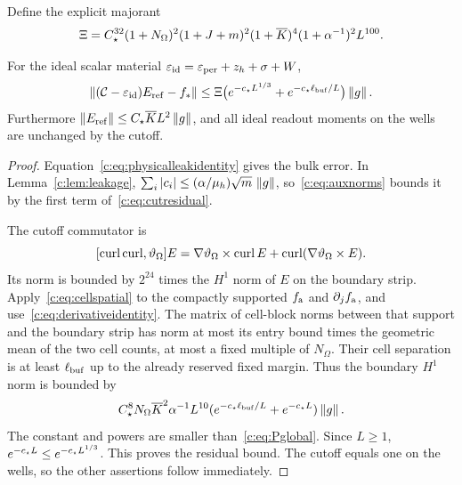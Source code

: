 Define the explicit majorant
\begin{equation}
 \Xi=C_\star^{32}(1+N_\Omega)^2(1+J+m)^2
                  (1+\overline K)^4(1+\alpha^{-1})^2L^{100}.   \label{c:eq:Pglobal}
\end{equation}
\begin{lemma}
\label{c:lem:cutresidual}
For the ideal scalar material
$\varepsilon_{\rm id}=\varepsilon_{\rm per}+z_h+\sigma+W$,
\begin{equation}
 \left\lVert (\mathcal C-\varepsilon_{\rm id})E_{\rm ref}-f_*\right\rVert
 \le\Xi\big(e^{-c_\star L^{1/3}}+e^{-c_\star \ell_{\rm buf}/L}\big)\left\lVert g\right\rVert.
                                                               \label{c:eq:cutresidual}
\end{equation}
Furthermore $\left\lVert E_{\rm ref}\right\rVert\le C_\star \overline KL^2\left\lVert g\right\rVert$, and all ideal readout
moments on the wells are unchanged by the cutoff.
\end{lemma}
\begin{proof}
Equation~\eqref{c:eq:physicalleakidentity} gives the bulk error. In
Lemma~\ref{c:lem:leakage}, $\sum_i|c_i|\le
(\alpha/\mu_h)\sqrt m\,\left\lVert g\right\rVert$, so~\eqref{c:eq:auxnorms} bounds it by the
first term of~\eqref{c:eq:cutresidual}.

The cutoff commutator is
\[
 [\operatorname{curl}\operatorname{curl},\vartheta_\Omega]E
   =\nabla\vartheta_\Omega\times\operatorname{curl} E
       +\operatorname{curl}(\nabla\vartheta_\Omega\times E).
\]
Its norm is bounded by $2^{24}$ times the $H^1$ norm of $E$ on the
boundary strip. Apply~\eqref{c:eq:cellspatial} to the compactly supported
$f_{\rm a}$ and $\partial_jf_{\rm a}$, and use~\eqref{c:eq:derivativeidentity}.
The matrix of cell-block norms between that support and the boundary
strip has norm at most its entry bound times the geometric mean of
the two cell counts, at most a fixed multiple of $N_\Omega$.
Their cell separation is at least $\ell_{\rm buf}$ up to the already reserved fixed
margin. Thus the boundary $H^1$ norm is bounded by
\[
 C_\star^8 N_\Omega \overline K^2\alpha^{-1}L^{10}
        (e^{-c_\star \ell_{\rm buf}/L}+e^{-c_\star L})\left\lVert g\right\rVert.
\]
The constant and powers are smaller than~\eqref{c:eq:Pglobal}.
Since $L\ge1$, $e^{-c_\star L}\le e^{-c_\star L^{1/3}}$.
This proves the residual bound. The cutoff equals one on the wells,
so the other assertions follow immediately.
\end{proof}


